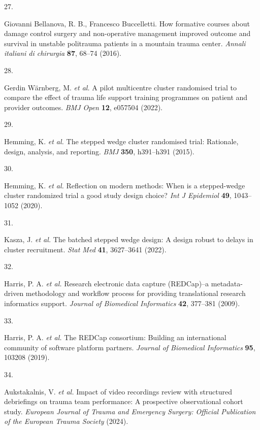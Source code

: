 \documentclass[
]{scrartcl}
\newlength{\cslhangindent}
\newlength{\csllabelwidth}
\newlength{\cslentryspacingunit} %
\newenvironment{CSLReferences}[2] %
 {%
  \setlength{\parindent}{0pt}
  \ifodd #1
  \let\oldpar\par
  \def\par{\hangindent=\cslhangindent\oldpar}
  \fi
  \setlength{\parskip}{#2\cslentryspacingunit}
 }%
 {}
\newcommand{\CSLLeftMargin}[1]{\parbox[t]{\csllabelwidth}{#1}}
\newcommand{\CSLRightInline}[1]{\parbox[t]{\linewidth - \csllabelwidth}{#1}\break}
\begin{document}
\begin{CSLReferences}{0}{0}
\leavevmode{}%
\CSLLeftMargin{27. }%
\CSLRightInline{Giovanni Bellanova, R. B., Francesco Buccelletti. How
formative courses about damage control surgery and non-operative
management improved outcome and survival in unstable politrauma patients
in a mountain trauma center. \emph{Annali italiani di chirurgia}
\textbf{87}, 68--74 (2016).}

\leavevmode{}%
\CSLLeftMargin{28. }%
\CSLRightInline{Gerdin Wärnberg, M. \emph{et al.} A pilot multicentre
cluster randomised trial to compare the effect of trauma life support
training programmes on patient and provider outcomes. \emph{BMJ Open}
\textbf{12}, e057504 (2022).}

\leavevmode{}%
\CSLLeftMargin{29. }%
\CSLRightInline{Hemming, K. \emph{et al.} The stepped wedge cluster
randomised trial: Rationale, design, analysis, and reporting. \emph{BMJ}
\textbf{350}, h391--h391 (2015).}

\leavevmode{}%
\CSLLeftMargin{30. }%
\CSLRightInline{Hemming, K. \emph{et al.} Reflection on modern methods:
When is a stepped-wedge cluster randomized trial a good study design
choice? \emph{Int J Epidemiol} \textbf{49}, 1043--1052 (2020).}

\leavevmode{}%
\CSLLeftMargin{31. }%
\CSLRightInline{Kasza, J. \emph{et al.} The batched stepped wedge
design: A design robust to delays in cluster recruitment. \emph{Stat
Med} \textbf{41}, 3627--3641 (2022).}

\leavevmode{}%
\CSLLeftMargin{32. }%
\CSLRightInline{Harris, P. A. \emph{et al.} Research electronic data
capture ({REDCap})--a metadata-driven methodology and workflow process
for providing translational research informatics support. \emph{Journal
of Biomedical Informatics} \textbf{42}, 377--381 (2009).}

\leavevmode{}%
\CSLLeftMargin{33. }%
\CSLRightInline{Harris, P. A. \emph{et al.} The {REDCap} consortium:
{Building} an international community of software platform partners.
\emph{Journal of Biomedical Informatics} \textbf{95}, 103208 (2019).}

\leavevmode{}%
\CSLLeftMargin{34. }%
\CSLRightInline{Aukstakalnis, V. \emph{et al.} Impact of video
recordings review with structured debriefings on trauma team
performance: A prospective observational cohort study. \emph{European
Journal of Trauma and Emergency Surgery: Official Publication of the
European Trauma Society} (2024).}


\end{CSLReferences}
\end{document}
